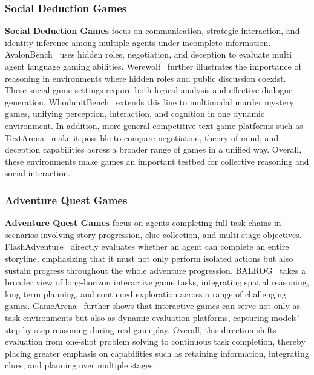 \subsubsection{Social Deduction Games}
\label{Social Deduction Games}
\textbf{Social Deduction Games} focus on communication, strategic interaction, and identity inference among multiple agents under incomplete information. 
AvalonBench~\cite{AvalonBench} uses hidden roles, negotiation, and deception to evaluate multi agent language gaming abilities. 
Werewolf~\cite{Werewolf} further illustrates the importance of reasoning in environments where hidden roles and public discussion coexist. These social game settings require both logical analysis and effective dialogue generation.
WhodunitBench~\cite{WhodunitBench} extends this line to multimodal murder mystery games, unifying perception, interaction, and cognition in one dynamic environment. In addition, more general competitive text game platforms such as TextArena~\cite{TextArena} make it possible to compare negotiation, theory of mind, and deception capabilities across a broader range of games in a unified way. Overall, these environments make games an important testbed for collective reasoning and social interaction.


\subsubsection{Adventure Quest Games}
\label{Adventure Quest Games}
\textbf{Adventure Quest Games} focus on agents completing full task chains in scenarios involving story progression, clue collection, and multi stage objectives. 
FlashAdventure~\cite{FlashAdventure} directly evaluates whether an agent can complete an entire storyline, emphasizing that it must not only perform isolated actions but also sustain progress throughout the whole adventure progression. BALROG~\cite{BALROG} takes a broader view of long-horizon interactive game tasks, integrating spatial reasoning, long term planning, and continued exploration across a range of challenging games. GameArena~\cite{GameArena} further shows that interactive games can serve not only as task environments but also as dynamic evaluation platforms, capturing models’ step by step reasoning during real gameplay. 
Overall, this direction shifts evaluation from one-shot problem solving to continuous task completion, thereby placing greater emphasis on capabilities such as retaining information, integrating clues, and planning over multiple stages.


